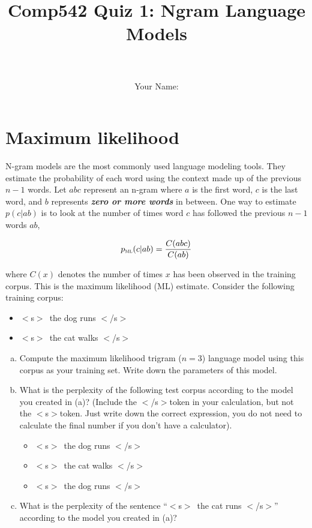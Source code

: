 \documentclass[a4paper]{article}
\title{Comp542 Quiz 1: Ngram Language Models}
\author{\\ \\Your Name: \underline{\hspace*{10cm}}}
\newcommand{\pml}{p_{\textsc{ml}}}
\newcommand{\sos}{$<$s$>$}
\newcommand{\eos}{$<$/s$>$}
\begin{document}
\maketitle
\newpage
\section{Maximum likelihood}

N-gram models are the most commonly used language modeling tools.
They estimate the probability of each word using the context made up
of the previous $n-1$ words.  Let $abc$ represent an n-gram where $a$
is the first word, $c$ is the last word, and $b$ represents {\bf {\em
    zero or more words}} in between.  One way to estimate $p(c|ab)$ is
to look at the number of times word $c$ has followed the previous
$n-1$ words $ab$,

\begin{equation}
\pml(c|ab) = \frac{C(abc)}{C(ab)}
\end{equation}

where $C(x)$ denotes the number of times $x$ has been
observed in the training corpus.  This is the maximum likelihood (ML)
estimate.  Consider the following training corpus:

\begin{itemize}
\item \sos\ the dog runs \eos
\item \sos\ the cat walks \eos
\end{itemize}

\begin{enumerate}[(a)]
\item Compute the maximum likelihood trigram ($n=3$) language model
  using this corpus as your training set.  Write down the parameters
  of this model.
\vspace*{5cm}
\item What is the perplexity of the following test corpus according to
  the model you created in (a)?  (Include the \eos token in your
  calculation, but not the \sos token.  Just write down the correct
  expression, you do not need to calculate the final number if you
  don't have a calculator).
\begin{itemize}
\item \sos\ the dog runs \eos
\item \sos\ the cat walks \eos
\item \sos\ the dog runs \eos
\end{itemize}
\vspace*{5cm}
\item What is the perplexity of the sentence ``\sos\ the cat runs
  \eos'' according to the model you created in (a)?
\end{enumerate}
\end{document}
